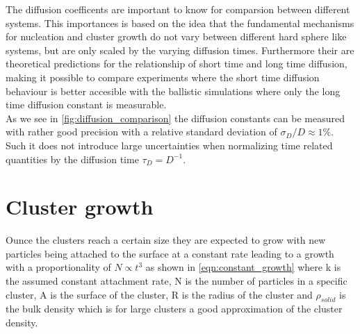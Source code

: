 The diffusion coefficents are important to know for comparsion between different systems. This importances is based on the idea that the fundamental mechanisms for nucleation and cluster growth do not vary between different hard sphere like systems, but are only scaled by the varying diffusion times. Furthermore their are theoretical predictions for the relationship of short time and long time diffusion, making it possible to compare experiments where the short time diffusion behaviour is better accesible with the ballistic simulations where only the long time diffusion constant is measurable.\\


As we see in \autoref{fig:diffusion_comparison} the diffusion constants can be measured with rather good precision with a relative standard deviation of $\sigma_D/D \approx 1\%$. Such it does not introduce large uncertainties when normalizing time related quantities by the diffusion time $\tau_{D} = D^{-1}$.

\section{Cluster growth}
\label{sec:cluster_growth}
Ounce the clusters reach a certain size they are expected to grow with new particles being attached to the surface at a constant rate leading to a growth with a proportionality of $N \propto t^3$ as shown in \autoref{eqn:constant_growth} where k is the assumed constant attachment rate, N is the number of particles in a specific cluster, A is the surface of the cluster, R is the radius of the cluster and $\rho_{solid}$ is the bulk density which is for large clusters a good approximation of the cluster density.\\

